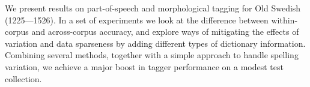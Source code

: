 We present results on part-of-speech and morphological tagging for Old Swedish (1225---1526). In a set of experiments we look at the difference between within-corpus and across-corpus accuracy, and explore ways of mitigating the effects of variation and data sparseness by adding different types of dictionary information. Combining several methods, together with a simple approach to handle spelling variation, we achieve a major boost in tagger performance on a modest test collection.
